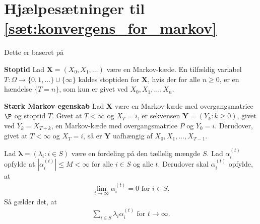 \section{Hjælpesætninger til \autoref{sæt:konvergens_for_markov}}\label{hjælpesæt}

Dette er baseret på \cite[s. 225 og 234]{oxford}

\begin{minipage}\textwidth
\begin{defn}\label{stoptid}\textbf{Stoptid} %
\newline
Lad $\bm X = (X_0, X_1, \dots)$ være en Markov-kæde.
En tilfældig variabel\\ $T: \Omega \to \{0,1,\ldots\}\cup \{\infty\}$ kaldes stoptiden for $\bm X$, hvis der for alle $n\geq 0$, er en hændelse $\{T = n\}$, som kun er givet ved $X_0,X_1, \ldots, X_n$.
\end{defn}
\end{minipage}

\begin{minipage}\textwidth
\begin{thmx} \label{stærk_markov}\textbf{Stærk Markov egenskab} %
\newline
Lad $\bm X$ være en Markov-kæde med overgangsmatrice $\P$ og stoptid $T$. Givet at $T < \infty$ og $X_T = i$, er sekvensen $\bm Y = (Y_k: k \geq 0)$, givet ved $Y_k = X_{T+k}$, en Markov-kæde med overgangsmatrice $P$ og $Y_0=i$. Derudover, givet at $T < \infty$ og $X_T = i$, så er $\bm Y$ uafhængig af $X_0, X_1, \ldots, X_{T-1}$.
\end{thmx}
\end{minipage}

\begin{minipage}\textwidth
\begin{lem} \label{sidstelemma}\textbf{} %
\newline
Lad $\bm \lambda = (\lambda_i : i \in S)$ være en fordeling på den tællelig mængde $S$. Lad $\alpha_i^{(t)}$ opfylde at $|\alpha_i^{(t)}| \leq M < \infty$ for alle $i \in S$ og alle $t$. Derudover skal $\alpha_i^{(t)}$ opfylde, at
\begin{align*}
    \lim_{t\to\infty} \alpha_i^{(t)}=0 \text{ for } i\in S.
\end{align*}
Så gælder det, at
\begin{align*}
    \sum_{i\in S}\lambda_i\alpha_i^{(t)} \text{ for } t\to\infty.
\end{align*}
\end{lem}
\end{minipage}